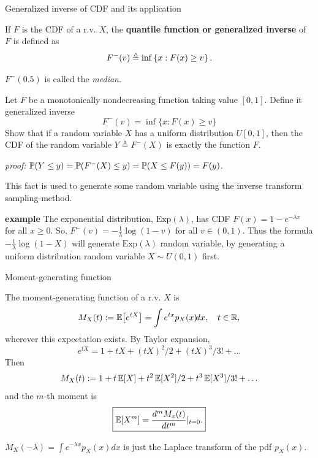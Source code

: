 \documentclass[english,10pt,handout]{beamer}
\begin{document}
\begin{frame}{Generalized inverse of CDF and its application}
\biz 
\item 
If   $F$ is the CDF of  a r.v. $X$,
the {\bf quantile function or   generalized inverse} of $F$ is defined as 
$$F^{-}(v) \triangleq \inf\left\{x:  F(x) \geq v\right\}.$$

$F^-(0.5)$ is called  the {\em median}.

\item
Let $F$ be  a monotonically nondecreasing function taking value $[0,1]$. 
 Define it generalized inverse  
$$F^{-}(v) = \inf\{x:  F(x) \geq v\}$$
Show that if a random variable $X$ has a uniform distribution $U[0, 1]$, then the CDF of the random variable  $Y\triangleq F^{-}(X)$
is exactly the function  $F$. 

\item {\it proof:}  $\mathbb{P}(Y\leq y)= \mathbb{P}(F^{-}(X)\leq y)=\mathbb{P}(X\leq F(y)) = F(y)$.

\item 


{This fact  is used to generate some random variable using the inverse transform sampling-method.}
\eiz

\pause
{\bf example}
The exponential distribution, $\mbox{Exp}(\lambda)$, has CDF $F(x)=1-e^{-\lambda x}$ for all $x\geq 0$.
So, $F^-(v)=-\frac{1}{\lambda} \log (1-v)$ for all $v\in (0,1)$.
Thus the formula $-\frac{1}{\lambda} \log (1-X)$ will generate $\mbox{Exp}(\lambda)$ random variable,  by generating a uniform distribution random variable $X\sim U(0,1)$ first.

\end{frame}




\begin{frame}
{Moment-generating function}
\biz
\item 
The moment-generating function of a r.v. $X$ is 
\[
{\displaystyle M_{X}(t):=\operatorname{\mathbb E} \!\left[e^{tX}\right] = \int e^{t x}p_X(x)\! dx,\quad t\in {\mathbb{R}} ,} 
\]
wherever this expectation exists. By Taylor expansion,
\[
e^{tX}= 1 + tX + (tX)^2/2 + (tX)^3/3!+\ldots
\]
Then
\[
M_{X}(t):= 1 +  t \operatorname{\mathbb E} [X] + t^2 \operatorname{\mathbb E} [X^2] /2 + t^3  \operatorname{\mathbb E} [X^3]/3!+\ldots
\]
and the $m$-th moment is 
\[\boxed{ \operatorname{\mathbb E} [X^m] = \frac{d^m M_x (t) }{d t^m}\vert_{t=0}.}\]

\item 
$
M_{X}(-\lambda)=  \int e^{-\lambda x }p_X(x) \! dx$
is just the Laplace transform of the pdf $p_X(x)$.
\eiz

\end{frame}
\end{document}
